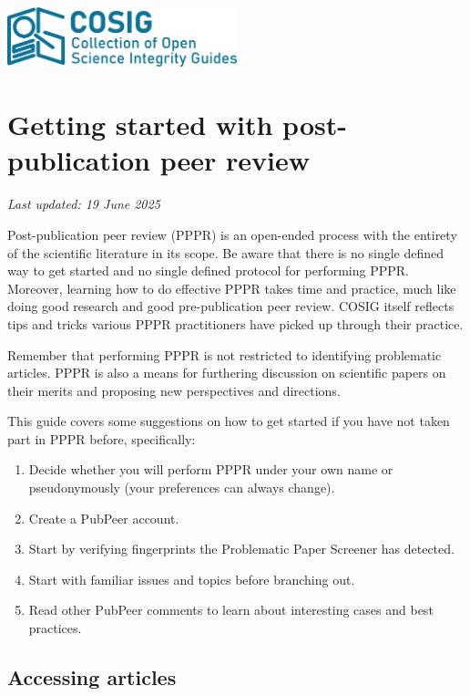 \documentclass[letterpaper, 12pt]{article}
\begin{document}
\flushleft
\includegraphics[width=0.5\textwidth]{img/home/241017_final_logo_mockup.png}

\section*{Getting started with post-publication peer review}
\textit{Last updated: 19 June 2025}

Post-publication peer review (PPPR) is an open-ended process with the entirety of the scientific literature in its scope. Be aware that there is no single defined way to get started and no single defined protocol for performing PPPR. Moreover, learning how to do effective PPPR takes time and practice, much like doing good research and good pre-publication peer review. COSIG itself reflects tips and tricks various PPPR practitioners have picked up through their practice.

Remember that performing PPPR is not restricted to identifying problematic articles. PPPR is also a means for furthering discussion on scientific papers on their merits and proposing new perspectives and directions.

This guide covers some suggestions on how to get started if you have not taken part in PPPR before, specifically:

\begin{enumerate}
    \setlength\itemsep{-0.5em}
    \item Decide whether you will perform PPPR under your own name or pseudonymously (your preferences can always change).
    \item Create a PubPeer account.
    \item Start by verifying fingerprints the Problematic Paper Screener has detected.
    \item Start with familiar issues and topics before branching out.
    \item Read other PubPeer comments to learn about interesting cases and best practices.
\end{enumerate}

\subsection*{Accessing articles}
\end{document}
